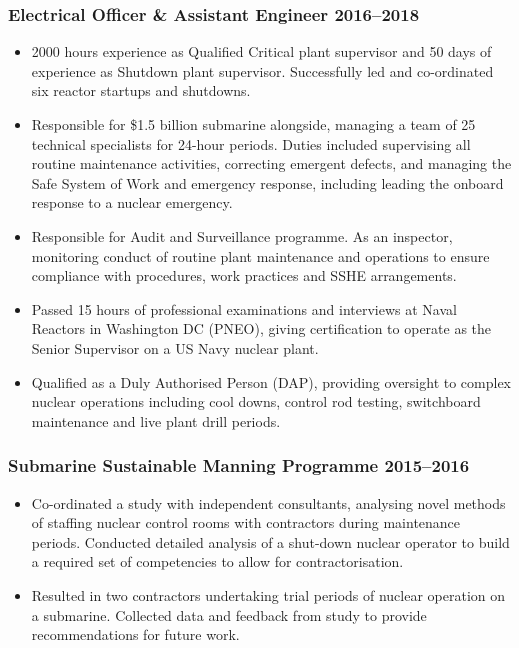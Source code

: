 \documentclass[a4paper, oneside, final, 11pt]{scrartcl} %
\begin{document}
				
\subsubsection*{Electrical Officer \& Assistant Engineer \hfill 2016--2018}  
\normalfont
\begin{itemize}
	\item 2000 hours experience as Qualified Critical plant supervisor and 50 days of experience as Shutdown plant supervisor. Successfully led and co-ordinated six reactor startups and shutdowns.	
	\item  Responsible for \$1.5 billion submarine alongside, managing a team of 25 technical specialists for 24-hour periods. Duties included supervising all routine maintenance activities, correcting emergent defects, and managing the Safe System of Work and emergency response, including leading the onboard response to a nuclear emergency.  
	\item Responsible for Audit and Surveillance programme. As an inspector, monitoring conduct of routine plant maintenance and operations to ensure compliance with procedures, work practices and SSHE arrangements. 
	\item Passed 15 hours of professional examinations and interviews at Naval Reactors in Washington DC (PNEO), giving certification to operate as the Senior Supervisor on a US Navy nuclear plant. 
	\item Qualified as a Duly Authorised Person (DAP), providing oversight to complex nuclear operations including cool downs, control rod testing, switchboard maintenance and live plant drill periods.
\end{itemize}


\subsubsection*{Submarine Sustainable Manning Programme \hfill 2015--2016}  
\normalfont
\begin{itemize}
	\item Co-ordinated a study with independent consultants, analysing novel methods of staffing nuclear control rooms with contractors during maintenance periods. Conducted detailed analysis of a shut-down nuclear operator to build a required set of competencies to allow for contractorisation.	
	\item  Resulted in two contractors undertaking trial periods of nuclear operation on a submarine. Collected data and feedback from study to provide recommendations for future work. \end{itemize}
\end{document}
